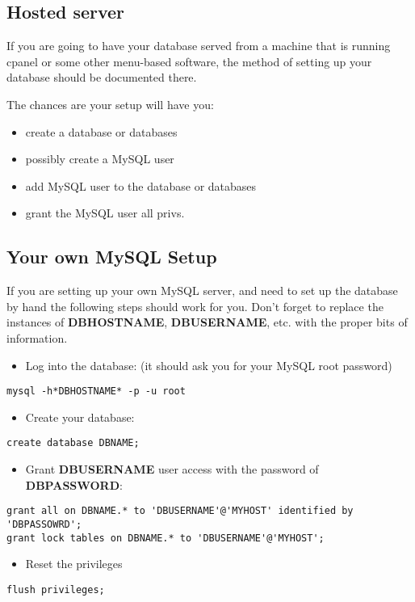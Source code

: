\documentclass[captions=tablesignature]{scrartcl}
\begin{document}
\subsection{Hosted server}
\label{sec-4-1}

If you are going to have your database served from a machine that
is running cpanel or some other menu-based software, the method of
setting up your database should be documented there.

The chances are your setup will have you:
\begin{itemize}
\item create a database or databases
\item possibly create a MySQL user
\item add MySQL user to the database or databases
\item grant the MySQL user all privs.
\end{itemize}

\subsection{Your own MySQL Setup}
\label{sec-4-2}

If you are setting up your own MySQL server, and need to set up the
database by hand the following steps should work for you.  Don't
forget to replace the instances of \textbf{DBHOSTNAME}, \textbf{DBUSERNAME},
etc. with the proper bits of information.

\begin{itemize}
\item Log into the database: (it should ask you for your MySQL root password)
\end{itemize}
\begin{verbatim}
mysql -h*DBHOSTNAME* -p -u root
\end{verbatim}
\begin{itemize}
\item Create your database:
\end{itemize}
\begin{verbatim}
create database DBNAME;
\end{verbatim}
\begin{itemize}
\item Grant \textbf{DBUSERNAME} user access with the password of \textbf{DBPASSWORD}:
\end{itemize}
\begin{verbatim}
grant all on DBNAME.* to 'DBUSERNAME'@'MYHOST' identified by 'DBPASSOWRD';
grant lock tables on DBNAME.* to 'DBUSERNAME'@'MYHOST';
\end{verbatim}
\begin{itemize}
\item Reset the privileges
\end{itemize}
\begin{verbatim}
flush privileges;
\end{verbatim}
\end{document}
